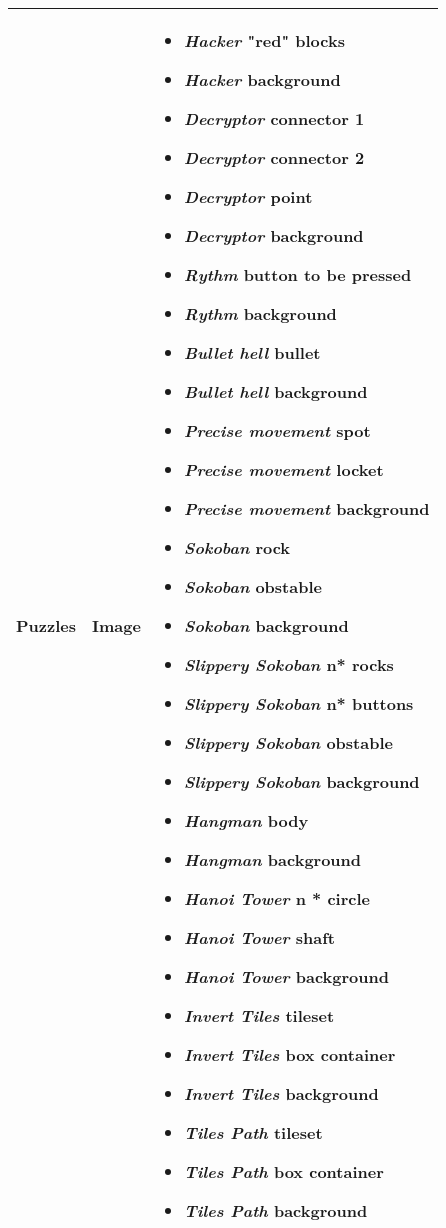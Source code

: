 \begin{tabular}{|m{3cm}|m{3cm}|m{7cm}|}
     \hline
     \textbf{Puzzles}& Image & 
     \begin{itemize}
     	\item \textit{Hacker} "red" blocks
     	\item \textit{Hacker} background
     	\item \textit{Decryptor} connector 1
     	\item \textit{Decryptor} connector 2
     	\item \textit{Decryptor} point
     	\item \textit{Decryptor} background
     	\item \textit{Rythm} button to be pressed
     	\item \textit{Rythm} background
		\item \textit{Bullet hell} bullet
		\item \textit{Bullet hell} background
		\item \textit{Precise movement} spot
		\item \textit{Precise movement} locket
		\item \textit{Precise movement} background
		\item \textit{Sokoban} rock
		\item \textit{Sokoban} obstable
		\item \textit{Sokoban} background
		\item \textit{Slippery Sokoban} n* rocks
		\item \textit{Slippery Sokoban} n* buttons
		\item \textit{Slippery Sokoban} obstable
		\item \textit{Slippery Sokoban} background
		\item \textit{Hangman} body
		\item \textit{Hangman} background
		\item \textit{Hanoi Tower} n * circle
		\item \textit{Hanoi Tower} shaft
		\item \textit{Hanoi Tower} background
		\item \textit{Invert Tiles} tileset
		\item \textit{Invert Tiles} box container
		\item \textit{Invert Tiles} background
		\item \textit{Tiles Path} tileset
		\item \textit{Tiles Path} box container
		\item \textit{Tiles Path} background
    \end{itemize}
     \\
	 \hline
\end{tabular}
\pagebreak

